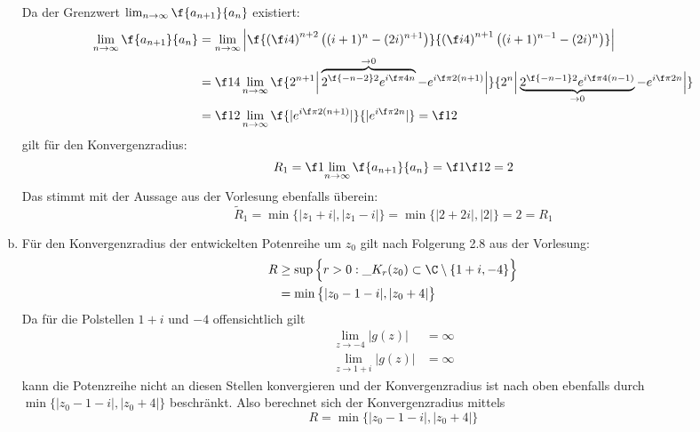 \documentclass[a4paper]{scrartcl}
\begin{document}
\begin{aufgabe}
\begin{enumerate}[(a)]
			Da der Grenzwert $\lim_{n\to \infty} \f {a_{n+1}}{a_n}$ existiert:
			\begin{align*}
				\lim_{n\to \infty} \f {a_{n+1}}{a_n} 
				&= \lim_{n\to \infty} \left| \f {\left(\f i4\right)^{n+2}\big((i+1)^n - (2i)^{n+1}\big)} {\left(\f i4\right)^{n+1}\big((i+1)^{n-1} - (2i)^n\big)} \right|\\
				&= \f 14 \lim_{n\to\infty} \f {2^{n+1} \Big| \overbrace{2^{\f {-n-2}2} e^{i\f \pi 4 n}}^{\to 0} - e^{i \f \pi 2 (n+1)} \Big|}{2^n \Big| \underbrace{2^{\f {-n-1}2} e^{i \f \pi 4 (n-1)}}_{\to 0} -e^{i\f \pi 2 n} \Big |}\\
				&= \f 12 \lim_{n\to\infty} \f {|e^{i\f \pi 2 (n+1)}|}{|e^{i \f \pi 2 n}|}
				= \f 12
			\end{align*}
			gilt für den Konvergenzradius:
			\begin{align*}
				R_1 = \f 1{\displaystyle \lim_{n\to\infty} \f {a_{n+1}}{a_n}} = \f 1{\f 12} = 2
			\end{align*}
			Das stimmt mit der Aussage aus der Vorlesung ebenfalls überein:
			\[
				\tilde R_1 = \min \{ |z_1+i| ,|z_1-i|\} = \min\{ |2+2i|, |2|\} = 2 = R_1
			\]
		\item
			Für den Konvergenzradius der entwickelten Potenreihe um $z_0$ gilt nach Folgerung 2.8 aus der Vorlesung:
			\begin{align*}
				R 
				&\ge \sup \Big\{r>0 : \_{K_r(z_0)}\subset \C\setminus \{1+i,-4\}\Big\} \\
				&= \min \big\{|z_0-1-i|, |z_0+4|\big\}
			\end{align*}
			Da für die Polstellen $1+i$ und $-4$ offensichtlich gilt
			\begin{align*}
				\lim_{z\to -4} |g(z)| &= \infty \\
				\lim_{z\to 1+i} |g(z)| &= \infty
			\end{align*}
			kann die Potenzreihe nicht an diesen Stellen konvergieren und der Konvergenzradius ist nach oben ebenfalls durch $\min \{|z_0-1-i|, |z_0+4|\}$ beschränkt.
			Also berechnet sich der Konvergenzradius mittels
			\[
				R = \min \big\{|z_0-1-i|, |z_0+4|\big\}
			\]
	\end{enumerate}
\end{aufgabe}
\end{document}
